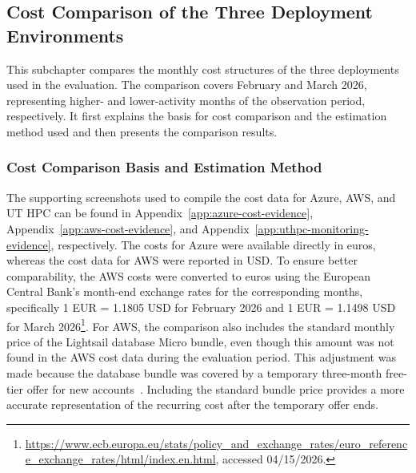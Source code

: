 \subsection{Cost Comparison of the Three Deployment Environments} \label{subsec:cost-comparison-of-the-three-deployment-environments}
This subchapter compares the monthly cost structures of the three deployments used in the evaluation.
The comparison covers February and March 2026, representing higher- and lower-activity months of the observation period, respectively.
It first explains the basis for cost comparison and the estimation method used and then presents the comparison results.

\subsubsection{Cost Comparison Basis and Estimation Method} \label{subsubsec:cost-comparison-basis-and-estimation-method}
The supporting screenshots used to compile the cost data for Azure, AWS, and UT HPC can be found in Appendix~\ref{app:azure-cost-evidence}, Appendix~\ref{app:aws-cost-evidence}, and Appendix~\ref{app:uthpc-monitoring-evidence}, respectively.
The costs for Azure were available directly in euros, whereas the cost data for AWS were reported in USD\@.
To ensure better comparability, the AWS costs were converted to euros using the European Central Bank's month-end exchange rates for the corresponding months, specifically 1 EUR = 1.1805 USD for February 2026 and 1 EUR = 1.1498 USD for March 2026\footnote{\url{https://www.ecb.europa.eu/stats/policy_and_exchange_rates/euro_reference_exchange_rates/html/index.en.html}, accessed 04/15/2026.}.
For AWS, the comparison also includes the standard monthly price of the Lightsail database Micro bundle, even though this amount was not found in the AWS cost data during the evaluation period.
This adjustment was made because the database bundle was covered by a temporary three-month free-tier offer for new accounts~\cite{aws_lightsail_pricing}.
Including the standard bundle price provides a more accurate representation of the recurring cost after the temporary offer ends.

